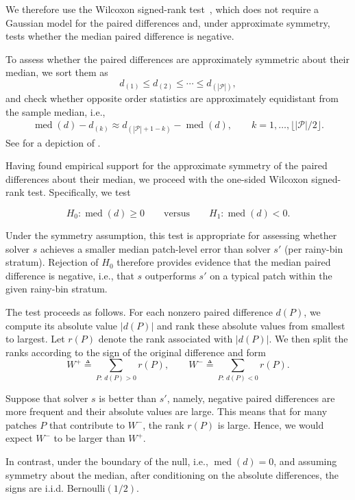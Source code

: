 \documentclass[a4paper,fleqn]{cas-sc}
\begin{document}
We therefore use the Wilcoxon signed-rank test~\cite{pratt1981concepts}, which does not require a Gaussian model for the paired differences and, under approximate symmetry, tests whether the median paired difference is negative.

To assess whether the paired differences are approximately symmetric about their median, we sort them as
\[
  d_{(1)}\le d_{(2)}\le \cdots \le d_{(|\mathcal P|)},
\]
and check whether opposite order statistics are approximately equidistant from the sample median, i.e.,
\begin{align}
  \label{eq:symmetry}
  \operatorname{med}(d)-d_{(k)}
  \approx
  d_{(|\mathcal P|+1-k)}-\operatorname{med}(d),
  \qquad k=1,\dots,\lfloor |\mathcal P|/2\rfloor.
\end{align}
See  for a depiction of .

Having found empirical support for the approximate symmetry of the paired differences about their median, we proceed with the one-sided Wilcoxon signed-rank test. Specifically, we test

\[
  H_0:\operatorname{med}(d)\ge 0
  \qquad\text{versus}\qquad
  H_1:\operatorname{med}(d)<0.
\]

Under the symmetry assumption, this test is appropriate for assessing whether solver $s$ achieves a smaller median patch-level error than solver $s'$ (per rainy-bin stratum). Rejection of $H_0$ therefore provides evidence that the median paired difference is negative, i.e., that $s$ outperforms $s'$ on a typical patch within the given rainy-bin stratum.

The test proceeds as follows. For each nonzero paired difference $d(P)$, we compute its absolute value $|d(P)|$ and rank these absolute values from smallest to largest. Let $r(P)$ denote the rank associated with $|d(P)|$. We then split the ranks according to the sign of the original difference and form
\[
  W^+ \triangleq \sum_{P:\, d(P)>0} r(P),
  \qquad
  W^- \triangleq \sum_{P:\, d(P)<0} r(P).
\]

Suppose that solver $s$ is better than $s'$, namely, negative paired differences are more frequent and their absolute values are large. This means that for many patches $P$ that contribute to $W^-$, the rank $r(P)$ is large. Hence, we would expect $W^-$ to be larger than $W^+$.

In contrast, under the boundary of the null, i.e., $\operatorname{med}(d)= 0$,
and assuming symmetry about the median,
after conditioning on the absolute differences, the signs are i.i.d. Bernoulli$(1/2)$.
\end{document}
